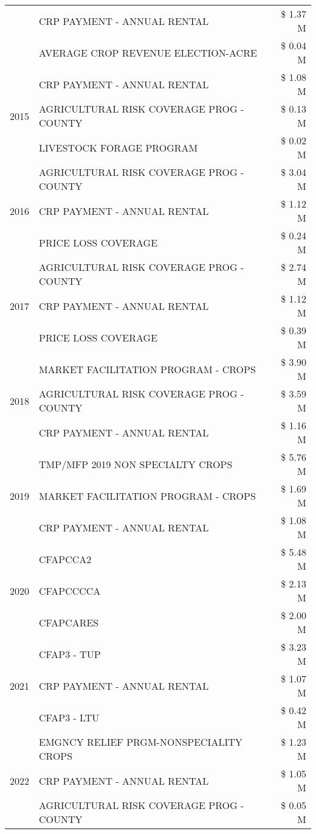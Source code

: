 \begin{tabular}{llr}
 & CRP PAYMENT - ANNUAL RENTAL & \$ 1.37 M \\
 & AVERAGE CROP REVENUE ELECTION-ACRE & \$ 0.04 M \\
\cline{1-3}
\multirow[t]{3}{*}{2015} & CRP PAYMENT - ANNUAL RENTAL & \$ 1.08 M \\
 & AGRICULTURAL RISK COVERAGE PROG - COUNTY & \$ 0.13 M \\
 & LIVESTOCK FORAGE PROGRAM & \$ 0.02 M \\
\cline{1-3}
\multirow[t]{3}{*}{2016} & AGRICULTURAL RISK COVERAGE PROG - COUNTY & \$ 3.04 M \\
 & CRP PAYMENT - ANNUAL RENTAL & \$ 1.12 M \\
 & PRICE LOSS COVERAGE & \$ 0.24 M \\
\cline{1-3}
\multirow[t]{3}{*}{2017} & AGRICULTURAL RISK COVERAGE PROG - COUNTY & \$ 2.74 M \\
 & CRP PAYMENT - ANNUAL RENTAL & \$ 1.12 M \\
 & PRICE LOSS COVERAGE & \$ 0.39 M \\
\cline{1-3}
\multirow[t]{3}{*}{2018} & MARKET FACILITATION PROGRAM - CROPS & \$ 3.90 M \\
 & AGRICULTURAL RISK COVERAGE PROG - COUNTY & \$ 3.59 M \\
 & CRP PAYMENT - ANNUAL RENTAL & \$ 1.16 M \\
\cline{1-3}
\multirow[t]{3}{*}{2019} & TMP/MFP 2019 NON SPECIALTY CROPS & \$ 5.76 M \\
 & MARKET FACILITATION PROGRAM - CROPS & \$ 1.69 M \\
 & CRP PAYMENT - ANNUAL RENTAL & \$ 1.08 M \\
\cline{1-3}
\multirow[t]{3}{*}{2020} & CFAPCCA2 & \$ 5.48 M \\
 & CFAPCCCCA & \$ 2.13 M \\
 & CFAPCARES & \$ 2.00 M \\
\cline{1-3}
\multirow[t]{3}{*}{2021} & CFAP3 - TUP & \$ 3.23 M \\
 & CRP PAYMENT - ANNUAL RENTAL & \$ 1.07 M \\
 & CFAP3 - LTU & \$ 0.42 M \\
\cline{1-3}
\multirow[t]{3}{*}{2022} & EMGNCY RELIEF PRGM-NONSPECIALITY CROPS & \$ 1.23 M \\
 & CRP PAYMENT - ANNUAL RENTAL & \$ 1.05 M \\
 & AGRICULTURAL RISK COVERAGE PROG - COUNTY & \$ 0.05 M \\
\cline{1-3}
\bottomrule
\end{tabular}
